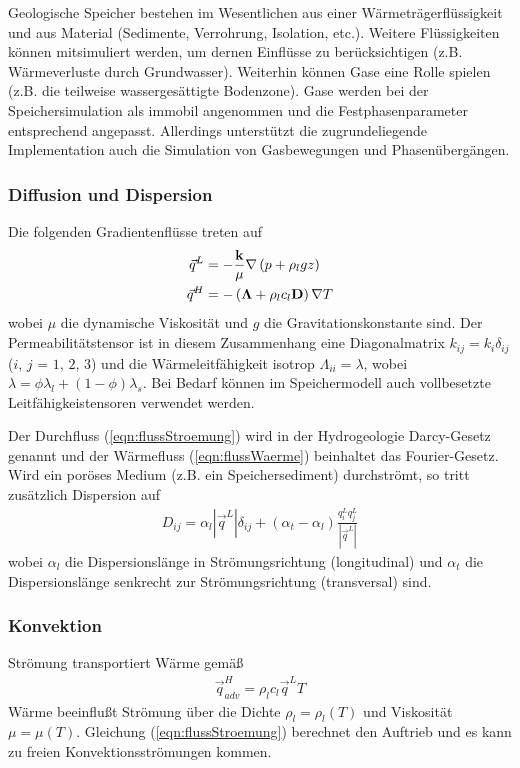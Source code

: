 \documentclass[12pt, a4paper, twoside, titlepage]{article}
\begin{document}
\noindent
Geologische Speicher bestehen im Wesentlichen aus einer W\" armetr\" agerfl\" ussigkeit und aus Material (Sedimente, Verrohrung, Isolation, etc.).
%
Weitere Fl\" ussigkeiten k\" onnen mitsimuliert werden, um dernen Einfl\" usse zu ber\" ucksichtigen (z.B. W\" armeverluste durch Grundwasser).
%
Weiterhin k\" onnen Gase eine Rolle spielen (z.B. die teilweise wasserges\" attigte Bodenzone).
%
Gase werden bei der Speichersimulation als immobil angenommen und die Festphasenparameter entsprechend angepasst.
%
Allerdings unterst\"utzt die zugrundeliegende Implementation auch die Simulation von Gasbewegungen und Phasen\" uberg\" angen.
%
\subsubsection{Diffusion und Dispersion}
%
\noindent
Die folgenden Gradientenfl\" usse treten auf
%
\begin{subequations}
\begin{align}
\vec q^L &= - \frac{\bold k}{\mu} \nabla\left( p + \rho_l g z \right)
\label{eqn:flussStroemung} \\
\vec q^H &= -\left( \bold \Lambda + \rho_l c_l \bold D \right) \nabla T
\label{eqn:flussWaerme}
\end{align}
\end{subequations}
%
wobei $\mu$ die dynamische Viskosit\" at und $g$ die Gravitationskonstante sind.
%
Der Permeabilit\" atstensor ist in diesem Zusammenhang eine Diagonalmatrix
$k_{ij} = k_i \delta_{ij} $ ($i$, $j$ = $1$, $2$, $3$)
und die W\" armeleitf\" ahigkeit isotrop $\Lambda_{ii} = \lambda$, wobei
$\lambda = \phi \lambda_l + (1-\phi) \lambda_s$.
%
Bei Bedarf k\" onnen im Speichermodell auch vollbesetzte Leitf\" ahigkeistensoren verwendet werden.

\noindent
Der Durchfluss (\ref{eqn:flussStroemung}) wird in der Hydrogeologie Darcy-Gesetz genannt und der W\" armefluss
(\ref{eqn:flussWaerme}) beinhaltet das Fourier-Gesetz. 
%
Wird ein por\" oses Medium (z.B. ein Speichersediment) durchstr\" omt, so tritt zus\" atzlich Dispersion auf
%
\begin{eqnarray}
D_{ij} = \alpha_l | \vec q^L | \delta_{ij} + \left( \alpha_t - \alpha_l \right) \frac{q_i^L q_j^L}{| \vec q^L | }  
\label{eqn:dispersion}
\end{eqnarray}
%
wobei $\alpha_l$ die Dispersionsl\" ange in Str\" omungsrichtung (longitudinal) und 
$\alpha_t$ die Dispersionsl\" ange senkrecht zur Str\" omungsrichtung (transversal) sind.
%
\subsubsection{Konvektion}
%
\noindent
Str\" omung transportiert W\" arme gem\" a\ss
%
\begin{eqnarray}
\vec q_{adv}^H = \rho_l c_l \vec q^L T
\label{eqn:advektion}
\end{eqnarray}
%
\noindent
W\" arme beeinflu\ss t Str\" omung \" uber die Dichte $\rho_l = \rho_l(T)$ und Viskosit\" at $\mu = \mu(T)$.
%
Gleichung (\ref{eqn:flussStroemung}) berechnet den Auftrieb und es kann zu freien Konvektionsstr\" omungen kommen.
%
\end{document}
